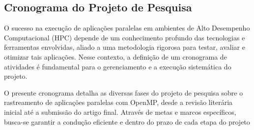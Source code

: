 \documentclass[ppgc,diss]{iiufrgs}
\begin{document}

\subsection{Cronograma do Projeto de Pesquisa}

O sucesso na execução de aplicações paralelas em ambientes de Alto Desempenho Computacional (HPC) depende de um conhecimento profundo das tecnologias e ferramentas envolvidas, aliado a uma metodologia rigorosa para testar, avaliar e otimizar tais aplicações. Nesse contexto, a definição de um cronograma de atividades é fundamental para o gerenciamento e a execução sistemática do projeto.

O presente cronograma detalha as diversas fases do projeto de pesquisa sobre o rastreamento de aplicações paralelas com OpenMP, desde a revisão literária inicial até a submissão do artigo final. Através de metas e marcos específicos, busca-se garantir a condução eficiente e dentro do prazo de cada etapa do projeto\\
\end{document}
